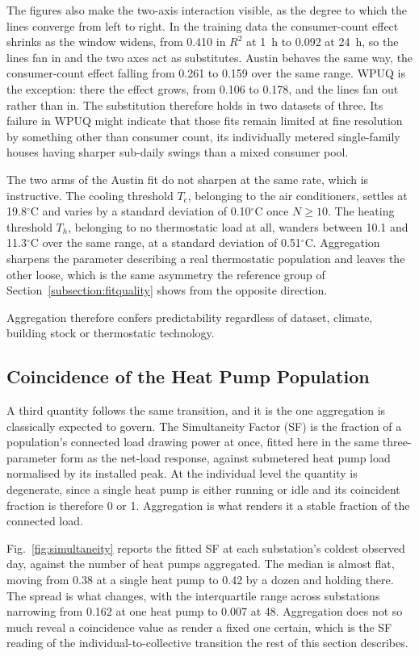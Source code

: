 \documentclass[9pt,journal,a4]{IEEEtran}
\begin{document}
The figures also make the two-axis interaction visible, as the degree to which the lines converge from left to right. In the training data the consumer-count effect shrinks as the window widens, from 0.410 in $R^2$ at 1~h to 0.092 at 24~h, so the lines fan in and the two axes act as substitutes. Austin behaves the same way, the consumer-count effect falling from 0.261 to 0.159 over the same range. WPUQ is the exception: there the effect grows, from 0.106 to 0.178, and the lines fan out rather than in. The substitution therefore holds in two datasets of three. Its failure in WPUQ might indicate that those fits remain limited at fine resolution by something other than consumer count, its individually metered single-family houses having sharper sub-daily swings than a mixed consumer pool.

The two arms of the Austin fit do not sharpen at the same rate, which is instructive. The cooling threshold $T_c$, belonging to the air conditioners, settles at 19.8$^\circ$C and varies by a standard deviation of 0.10$^\circ$C once $N \geq 10$. The heating threshold $T_h$, belonging to no thermostatic load at all, wanders between 10.1 and 11.3$^\circ$C over the same range, at a standard deviation of 0.51$^\circ$C. Aggregation sharpens the parameter describing a real thermostatic population and leaves the other loose, which is the same asymmetry the reference group of Section~\ref{subsection:fitquality} shows from the opposite direction.

Aggregation therefore confers predictability regardless of dataset, climate, building stock or thermostatic technology.

\subsection{Coincidence of the Heat Pump Population}
\label{subsection:simultaneity}

A third quantity follows the same transition, and it is the one aggregation is classically expected to govern. The Simultaneity Factor (SF) is the fraction of a population's connected load drawing power at once, fitted here in the same three-parameter form as the net-load response, against submetered heat pump load normalised by its installed peak. At the individual level the quantity is degenerate, since a single heat pump is either running or idle and its coincident fraction is therefore 0 or 1. Aggregation is what renders it a stable fraction of the connected load.

Fig.~\ref{fig:simultaneity} reports the fitted SF at each substation's coldest observed day, against the number of heat pumps aggregated. The median is almost flat, moving from 0.38 at a single heat pump to 0.42 by a dozen and holding there. The spread is what changes, with the interquartile range across substations narrowing from 0.162 at one heat pump to 0.007 at 48. Aggregation does not so much reveal a coincidence value as render a fixed one certain, which is the SF reading of the individual-to-collective transition the rest of this section describes.
\end{document}
